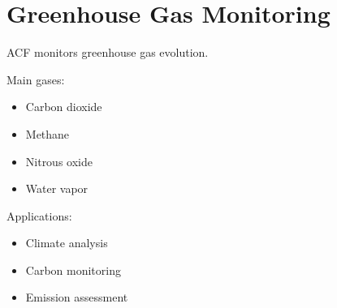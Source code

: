 \section{Greenhouse Gas Monitoring}


ACF monitors greenhouse gas evolution.



Main gases:


\begin{itemize}

\item Carbon dioxide

\item Methane

\item Nitrous oxide

\item Water vapor

\end{itemize}



Applications:


\begin{itemize}

\item Climate analysis

\item Carbon monitoring

\item Emission assessment

\end{itemize}
